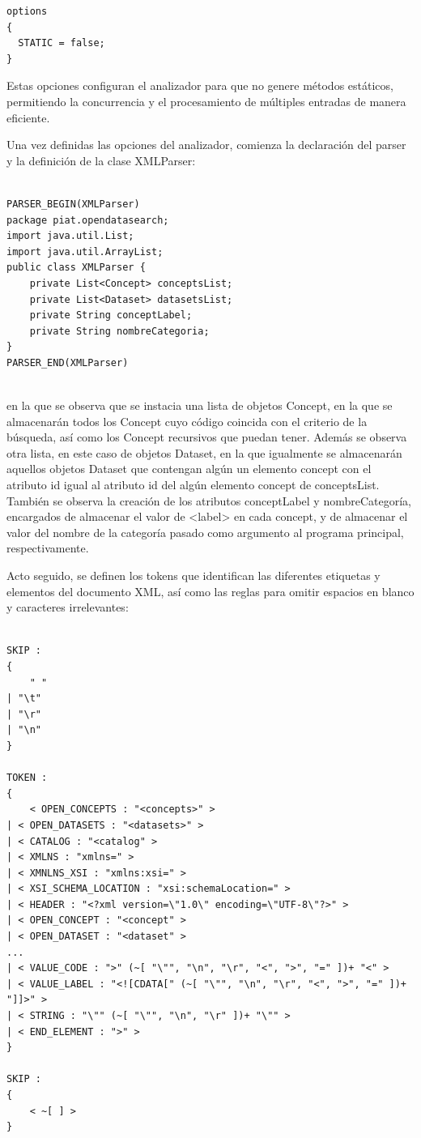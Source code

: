 \lstset{inputencoding=utf8/latin1}
\begin{lstlisting}
options
{
  STATIC = false;
}
\end{lstlisting}

Estas opciones configuran el analizador para que no genere métodos estáticos, permitiendo la concurrencia y el procesamiento de múltiples entradas de manera eficiente.

Una vez definidas las opciones del analizador, comienza la declaración del parser y la definición de la clase XMLParser:

\lstset{inputencoding=utf8/latin1}
\begin{lstlisting}
    
PARSER_BEGIN(XMLParser)
package piat.opendatasearch;
import java.util.List;
import java.util.ArrayList;
public class XMLParser {
    private List<Concept> conceptsList;
    private List<Dataset> datasetsList;
    private String conceptLabel;
    private String nombreCategoria;
}
PARSER_END(XMLParser)
    
\end{lstlisting}

en la que se observa que se instacia una lista de objetos Concept, en la que se almacenarán todos los Concept cuyo código coincida con el criterio de la búsqueda, así como los Concept recursivos que puedan tener.
Además se observa otra lista, en este caso de objetos Dataset, en la que igualmente se almacenarán aquellos objetos Dataset que contengan algún un elemento concept con el atributo id igual al atributo id del algún elemento concept de conceptsList.
También se observa la creación de los atributos conceptLabel y nombreCategoría, encargados de almacenar el valor de <label> en cada concept, y de almacenar el valor del nombre de la categoría pasado como argumento al programa principal, respectivamente.

Acto seguido, se definen los tokens que identifican las diferentes etiquetas y elementos del documento XML, así como las reglas para omitir espacios en blanco y caracteres irrelevantes:

\lstset{inputencoding=utf8/latin1}
\begin{lstlisting}
    
SKIP :
{
    " "
| "\t"
| "\r"
| "\n"
}

TOKEN :
{
    < OPEN_CONCEPTS : "<concepts>" >
| < OPEN_DATASETS : "<datasets>" >
| < CATALOG : "<catalog" >
| < XMLNS : "xmlns=" >
| < XMNLNS_XSI : "xmlns:xsi=" >
| < XSI_SCHEMA_LOCATION : "xsi:schemaLocation=" >
| < HEADER : "<?xml version=\"1.0\" encoding=\"UTF-8\"?>" >
| < OPEN_CONCEPT : "<concept" >
| < OPEN_DATASET : "<dataset" >
...
| < VALUE_CODE : ">" (~[ "\"", "\n", "\r", "<", ">", "=" ])+ "<" >
| < VALUE_LABEL : "<![CDATA[" (~[ "\"", "\n", "\r", "<", ">", "=" ])+ "]]>" >
| < STRING : "\"" (~[ "\"", "\n", "\r" ])+ "\"" >
| < END_ELEMENT : ">" >
}

SKIP :
{
    < ~[ ] >
}
    
\end{lstlisting}


